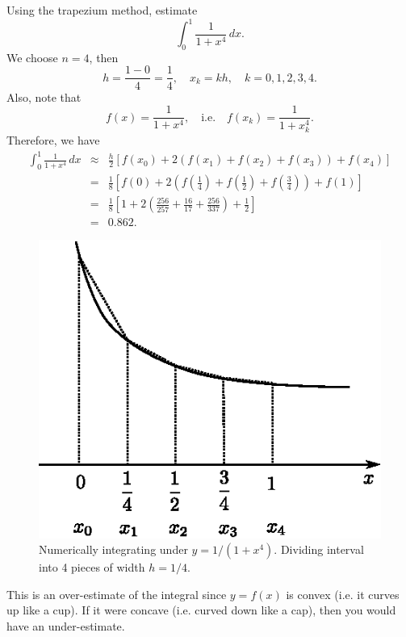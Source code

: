 \begin{example}
Using the trapezium method, estimate
\[\int_0^1\frac{1}{1+x^4}\,dx.\]
We choose $n=4$, then
\[h=\frac{1-0}{4}=\frac{1}{4},\quad x_k=kh,\quad k=0,1,2,3,4.\]
Also, note that
\[f(x)=\frac{1}{1+x^4},\quad \text{i.e.}\quad f(x_k)=\frac{1}{1+x_k^4}.\]
Therefore, we have
\begin{eqnarray*}
\int_0^1\frac{1}{1+x^4}\,dx&\approx&\frac{h}{2}\left[f(x_0)+2(f(x_1)+f(x_2)+f(x_3))+f(x_4)\right] \\
&=&\frac{1}{8}\left[f(0)+2(f\left(\frac{1}{4}\right)+f\left(\frac{1}{2}\right)+f\left(\frac{3}{4}\right))+f(1)\right]\\
&=&\frac{1}{8}\left[1+2\left(\frac{256}{257}+\frac{16}{17}+\frac{256}{337}\right)+\frac{1}{2}\right]\\
&=&0.862.
\end{eqnarray*}

\begin{figure}[H]
\centering
\includegraphics[scale=0.8]{img/trapexium-rule-ex1}
\caption{Numerically integrating under $y=1/(1+x^4)$. Dividing interval into 4 pieces of width $h=1/4$.}
\label{fig:trapexium-rule-ex1}
\end{figure}

This is an over-estimate of the integral since $y=f(x)$ is convex (i.e. it curves up like a cup). If it were concave (i.e. curved down like a cap), then you would have an under-estimate. 
\end{example}
